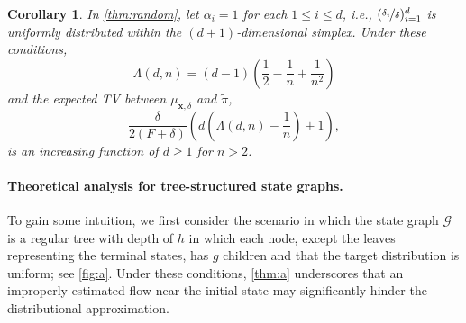 \documentclass{article}
\theoremstyle{plain}
\newtheorem{corollary}[theorem]{Corollary}
\theoremstyle{definition}
\theoremstyle{remark}
\theoremstyle{remark}
\begin{document}
\begin{corollary} \label{col:random} 
    In \autoref{thm:random}, let $\alpha_{i} = 1$ for each $1 \le i \le d$, i.e., $(\nicefrac{\delta_{i}}{\delta})_{i=1}^{d}$ is uniformly distributed within the $(d + 1)$-dimensional simplex. Under these conditions, 
    \begin{equation*}
        \Lambda(d, n) = (d - 1) \left( \frac{1}{2} - \frac{1}{n} + \frac{1}{n^{2}}\right)  
    \end{equation*}
    and the expected TV between $\mu_{\mathbf{x}, \delta}$  and $\tilde{\pi}$, 
    \begin{equation*}
        \frac{\delta}{2(F + \delta)} \left( d \left( \Lambda(d, n) - \frac{1}{n} \right) + 1 \right),   
    \end{equation*}
    is an increasing function of $d \ge 1$ for $n > 2$. 
\end{corollary}



\paragraph{Theoretical analysis for tree-structured state graphs.} To gain some intuition, we first consider the scenario in which the state graph $\mathcal{G}$ is a regular tree with depth of $h$ in which each node, except the leaves representing the terminal states, has $g$ children and that the target distribution is uniform; see \autoref{fig:a}. Under these conditions, \autoref{thm:a} underscores that an improperly estimated flow near the initial state may significantly hinder the distributional approximation. 
\end{document}
